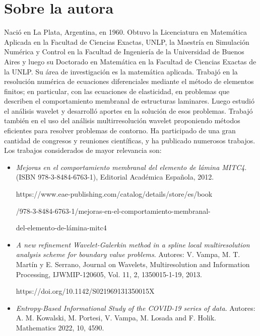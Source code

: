 \documentclass[a4paper,12pt,twopage]{book}
\begin{document}
\chapter*{Sobre la autora}
\begin{parchment} {Nació en La Plata, Argentina, en 1960. Obtuvo la Licenciatura en Matemática Aplicada en la Facultad de Ciencias Exactas, UNLP,  la Maestría en Simulación Numérica y Control en la Facultad de Ingeniería de la Universidad de Buenos Aires y luego su Doctorado en Matemática en la Facultad de Ciencias Exactas de la UNLP. 
Su área de investigación es la matemática aplicada. Trabajó en la resolución numérica de ecuaciones diferenciales mediante el método de elementos finitos; en particular, con las ecuaciones de elasticidad, en problemas que describen el comportamiento membranal de estructuras laminares. Luego estudió el análisis wavelet y desarrolló aportes en la solución de esos problemas. Trabajó también en el uso del análisis multirresolución wavelet proponiendo métodos eficientes para resolver problemas de contorno. 
Ha participado  de una gran cantidad de congresos y reuniones científicas, y ha publicado numerosos trabajos. Los trabajos considerados de mayor relevancia son:

\bigskip

\begin{itemize}
\item
\textit{Mejoras en el comportamiento membranal del elemento de lámina MITC4}. (ISBN 978-3-8484-6763-1), Editorial Académica Española, 2012. 

https://www.eae-publishing.com/catalog/details/store/es/book

/978-3-8484-6763-1/mejoras-en-el-comportamiento-membranal-

del-elemento-de-lámina-mitc4
\newline
\item
\textit{A new refinement Wavelet-Galerkin method in a spline local multiresolution analysis scheme for boundary value problems}. 
Autores: V. Vampa, M. T. Martín y E. Serrano, Journal on Wavelets, Multiresolution and Information Processing, IJWMIP-120605, Vol. 11, 2, 1350015-1-19, 2013.

https://doi.org/10.1142/S021969131350015X


\item
\textit{Entropy-Based Informational Study of the COVID-19 series of data}. Autores: A. M. Kowalski, M. Portesi, V. Vampa, M. Losada and F. Holik. Mathematics 2022, 10, 4590.


\end{itemize}}
\end{parchment}
\end{document}

